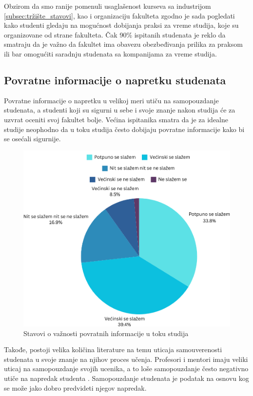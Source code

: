 \documentclass[a4paper]{article}
\begin{document}
{Obzirom da smo ranije pomenuli usaglašenost kurseva sa industrijom \ref{subsec:tržište_stavovi}, kao i organizaciju fakulteta  zgodno je sada pogledati kako studenti gledaju na mogućnost dobijanja praksi za vreme studija, koje su organizovane od strane fakulteta. Čak 90\% ispitanih studenata je reklo da smatraju da je važno da fakultet ima obavezu obezbeđivanja prilika za praksom ili bar omogućiti saradnju studenata sa kompanijama za vreme studija.

\subsection{Povratne informacije o napretku studenata}
\label{subsec:povrane_informacije}

Povratne informacije o napretku u velikoj meri utiču na samopouzdanje studenata, a studenti koji su sigurni u sebe i svoje znanje nakon studija će za uzvrat oceniti svoj fakultet bolje. Većina ispitanika smatra da je za idealne studije neophodno da u toku studija često dobijaju povratne informacije kako bi se osećali sigurnije. 
\begin{figure}[h!]
\begin{center}
    \includegraphics[scale = 0.3]{PieChartPovratneInformacije.png}
    \caption{Stavovi o važnosti povratnih informacije u toku studija}
    \label{fig:povratne_informacije}
\end{center}
\end{figure}

Takođe, postoji velika količina literature na temu uticaja samouverenosti studenata u svoje znanje na njihov proces učenja. Profesori i mentori imaju veliki uticaj na samopouzdanje svojih ucenika, a to loše samopouzdanje često negativno utiče na napredak studenta \cite{G1}. 
Samopouzdanje studenata je podatak na osnovu kog se može jako dobro predvideti njegov napredak.\cite{G2}


}
\end{document}
